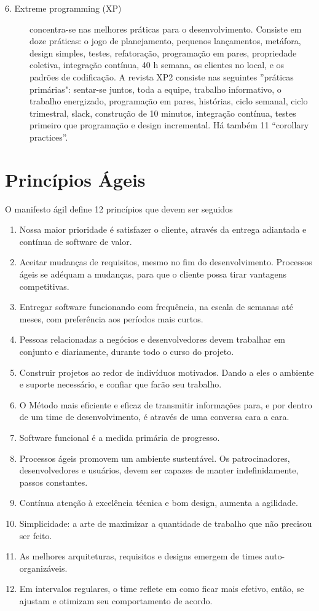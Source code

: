 \begin{description}
\item [6. Extreme programming (XP)]
concentra-se nas melhores práticas para o desenvolvimento.  Consiste em doze práticas: o jogo de planejamento, pequenos lançamentos,  metáfora, design simples, testes, refatoração, programação em pares,  propriedade coletiva, integração contínua, 40 h semana, os clientes no local,  e os padrões de codificação. A revista XP2 consiste nas seguintes  ''práticas primárias": sentar-se juntos, toda a equipe, trabalho informativo,  o trabalho energizado, programação em pares, histórias, ciclo semanal,  ciclo trimestral, slack, construção de 10 minutos, integração contínua,  testes primeiro que programação e design incremental.  Há também 11 ``corollary practices''.
\end{description}

\section{Princípios Ágeis}
\label{principios-ageis}
O manifesto ágil define 12 princípios que devem ser seguidos~\cite{manifesto2013}
%
\begin{enumerate}
\item Nossa maior prioridade é satisfazer o cliente, através da entrega adiantada e contínua de software de valor.
\item Aceitar mudanças de requisitos, mesmo no fim do desenvolvimento. Processos ágeis se adéquam a mudanças, para que o cliente possa tirar vantagens competitivas.
\item Entregar software funcionando com frequência, na escala de semanas até meses, com preferência aos períodos mais curtos.
\item Pessoas relacionadas a negócios e desenvolvedores devem trabalhar em conjunto e diariamente, durante todo o curso do projeto.
\item Construir projetos ao redor de indivíduos motivados. Dando a eles o ambiente e suporte necessário, e confiar que farão seu trabalho.
\item O Método mais eficiente e eficaz de transmitir informações para, e por dentro de um time de desenvolvimento, é através de uma conversa cara a cara.
\item Software funcional é a medida primária de progresso.
\item Processos ágeis promovem um ambiente sustentável. Os patrocinadores, desenvolvedores e usuários, devem ser capazes de manter indefinidamente, passos constantes.
\item Contínua atenção à excelência técnica e bom design, aumenta a agilidade.
\item Simplicidade: a arte de maximizar a quantidade de trabalho que não precisou ser feito.
\item As melhores arquiteturas, requisitos e designs emergem de times auto-organizáveis.
\item Em intervalos regulares, o time reflete em como ficar mais efetivo, então, se ajustam e otimizam seu comportamento de acordo.
\end{enumerate}

